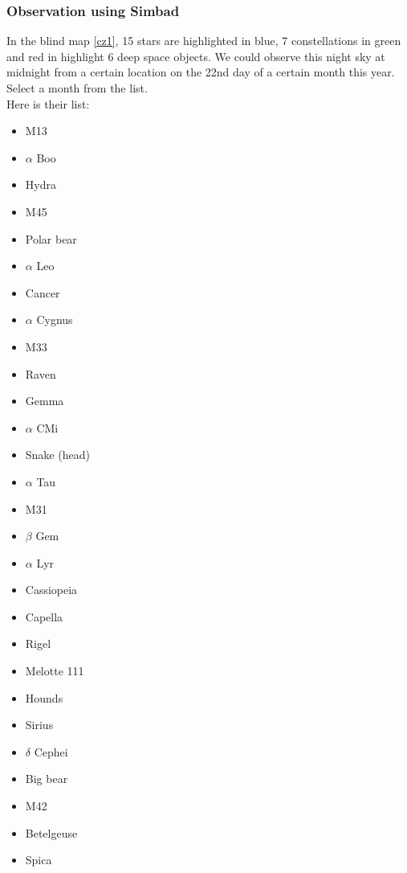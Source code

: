\documentclass[a4paper,12pt]{extarticle}
\begin{document}
\subsubsection{Observation using Simbad}
In the blind map \ref{cz1}, 15 stars are highlighted in blue, 7 constellations in green and red in highlight 6 deep space objects. We could observe this night sky at midnight from a certain location on the 22nd day of a certain month this year. Select a month from the list.\\
Here is their list:
\begin{multicols}{4}
	\begin{itemize}
		\item M13 
		\item $\alpha$ Boo
		\item Hydra
		\item M45 
		\item Polar bear
		\item $\alpha$ Leo
		\item Cancer
		\item $\alpha$ Cygnus
		\item M33 
		\item Raven
		\item Gemma
		\item $\alpha$ CMi
		\item Snake (head)
		\item $\alpha$ Tau
		\item M31 
		\item  $\beta$ Gem
		\item $\alpha$ Lyr
		\item Cassiopeia
		\item Capella
		\item Rigel
		\item Melotte 111 
		\item  Hounds
		\item Sirius
		\item $\delta$ Cephei 
		\item Big bear
		\item  M42 
		\item Betelgeuse
		\item Spica
	\end{itemize}
\end{multicols}
\end{document}

